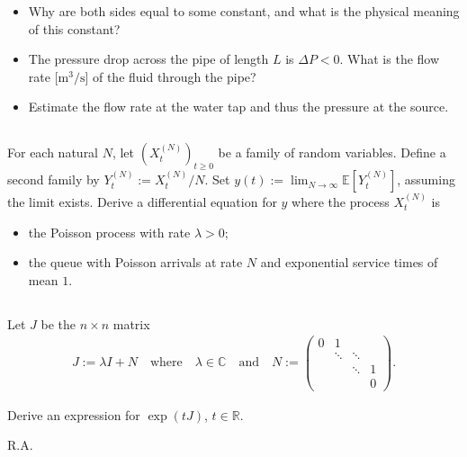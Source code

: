 \documentclass[12pt,a4paper]{article}
\begin{document}
    \begin{itemize}
    \item  
        Why are both sides equal to some constant,
        and
        what is the physical meaning of this constant?
    \item
        The pressure drop across the pipe 
        of length $L$ is $\Delta P < 0$.
        What is the flow rate [$\mathrm{m^3 / s}$]
        of the fluid through the pipe?
    \item
        Estimate the flow rate at the water tap
        and 
        thus the pressure at the source.
    \end{itemize}


    
    
    \subsection{}
    
    For each natural $N$,
    let $( X_t^{(N)} )_{t \geq 0}$ be a family of random variables.
    Define a second family by $Y_t^{(N)} := X_t^{(N)} / N$.
    Set $y(t) := \lim_{N \to \infty} \mathbb{E}[Y_t^{(N)}]$,
    assuming the limit exists.
    Derive a differential equation for $y$ 
    where the process $X_t^{(N)}$ is 
    \begin{itemize}
    \item 
        the Poisson process with 
        rate $\lambda > 0$;
    \item
        the queue with
        Poisson arrivals at rate $N$ 
        and
        exponential service times of mean $1$.
    \end{itemize}

    
    
    \subsection{}
    
    
    Let $J$ be the $n \times n$ matrix
    \begin{align}
        J :=
        \lambda I + N
        \quad\text{where}\quad
        \lambda \in \mathbb{C}
        \quad\text{and}\quad
        N :=
        \begin{pmatrix}
            0 & 1      &        &   \\
              & \ddots & \ddots &   \\
              &        & \ddots & 1 \\
              &        &        & 0
        \end{pmatrix}
        .
    \end{align}
    
    Derive an expression for $\exp(t J)$, $t \in \mathbb{R}$.



    \vfill\hfill 
    {\small\textcopyright} R.A.
\end{document}
